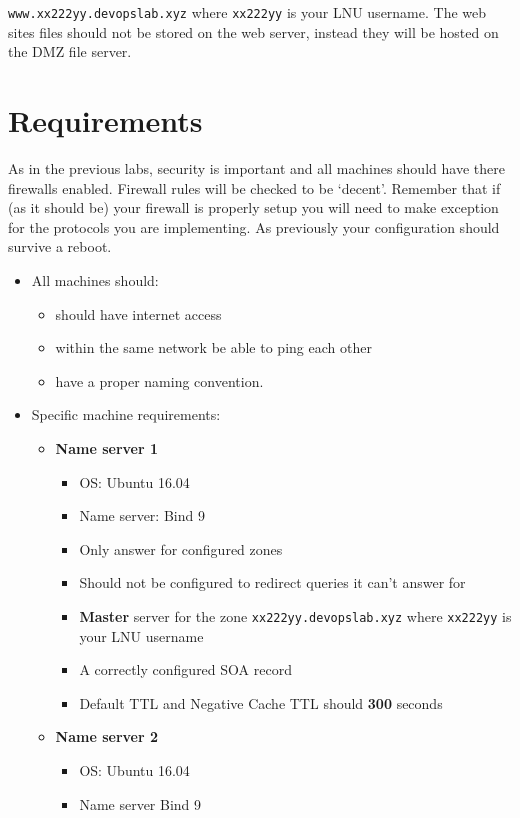 \documentclass[paper=a4, fontsize=11pt]{report} %
\begin{document}
\texttt{www.xx222yy.devopslab.xyz} where \texttt{xx222yy} is your LNU username. The web sites files should not be stored on the web server, instead they will be hosted on the DMZ file server.
\pagebreak

\section{Requirements}
\label{tasks}
As in the previous labs, security is important and all machines should have there firewalls enabled. Firewall rules will be checked to be ‘decent’. Remember that if (as it should be) your firewall is properly setup you will need to make exception for the protocols you are implementing.
As previously your configuration should survive a reboot.

\begin{itemize}
    \item All machines should:
    \begin{itemize}
		\item should have internet access
		\item within the same network be able to ping each other
    	\item have a proper naming convention.
    \end{itemize}
	\item Specific machine requirements:
    \begin{itemize}
        \item \textbf{Name server 1}
        \begin{itemize}
			\item OS: Ubuntu 16.04
			\item Name server: Bind 9
			\item Only answer for configured zones
			\item Should not be configured to redirect queries it can't answer for
			\item \textbf{Master} server for the zone \texttt{xx222yy.devopslab.xyz} where \texttt{xx222yy} is your LNU username
			\item A correctly configured SOA record
			\item Default TTL and Negative Cache TTL should \textbf{300} seconds
        \end{itemize}  
        \item \textbf{Name server 2}
        \begin{itemize}
			\item OS: Ubuntu 16.04
			\item Name server Bind 9

\end{itemize}
\end{itemize}
\end{itemize}
\end{document}
